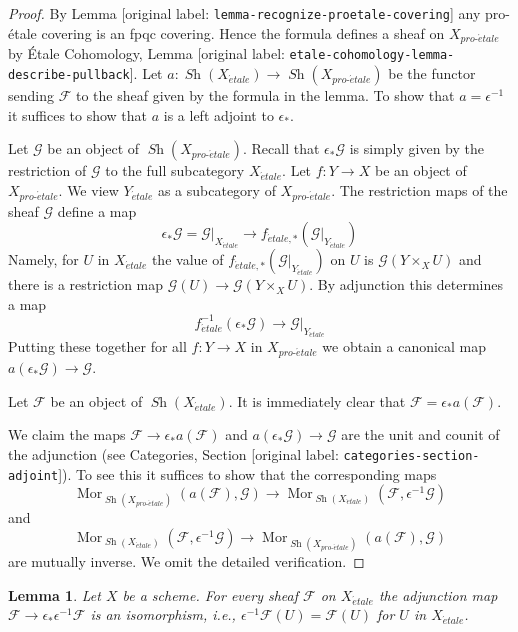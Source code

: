 \documentclass[10pt,a4paper]{article}
\theoremstyle{plain}
\newtheorem{lemma}[subsection]{Lemma}
\theoremstyle{definition}
\theoremstyle{remark}
\numberwithin{equation}{subsection}
\def\Mor{\mathop{\mathrm{Mor}}\nolimits}
\def\Sh{\mathop{\mathit{Sh}}\nolimits}
\def\proetale{{pro\text{-}\acute{e}tale}}
\def\etale{{\acute{e}tale}}
\begin{document}
\begin{proof}
By Lemma [original label: \nolinkurl{lemma-recognize-proetale-covering}] any pro-\'etale covering
is an fpqc covering. Hence the formula defines a sheaf on $X_\proetale$
by \'Etale Cohomology, Lemma [original label: \nolinkurl{etale-cohomology-lemma-describe-pullback}].
Let $a : \Sh(X_\etale) \to \Sh(X_\proetale)$ be the functor
sending $\mathcal{F}$ to the sheaf given by the formula in the lemma.
To show that $a = \epsilon^{-1}$ it suffices to show that $a$ is a
left adjoint to $\epsilon_*$.

\medskip\noindent
Let $\mathcal{G}$ be an object of $\Sh(X_\proetale)$.
Recall that $\epsilon_*\mathcal{G}$ is simply given by the restriction of
$\mathcal{G}$ to the full subcategory $X_\etale$.
Let $f : Y \to X$ be an object of $X_\proetale$.
We view $Y_\etale$ as a subcategory of $X_\proetale$.
The restriction maps of the sheaf $\mathcal{G}$ define a map
$$
\epsilon_*\mathcal{G} = \mathcal{G}|_{X_\etale}
\longrightarrow
f_{\etale, *}(\mathcal{G}|_{Y_\etale})
$$
Namely, for $U$ in $X_\etale$ the value of
$f_{\etale, *}(\mathcal{G}|_{Y_\etale})$ on $U$
is $\mathcal{G}(Y \times_X U)$ and there is a restriction
map $\mathcal{G}(U) \to \mathcal{G}(Y \times_X U)$.
By adjunction this determines a map
$$
f_\etale^{-1}(\epsilon_*\mathcal{G}) \to \mathcal{G}|_{Y_\etale}
$$
Putting these together for all $f : Y \to X$ in $X_\proetale$
we obtain a canonical map $a(\epsilon_*\mathcal{G}) \to \mathcal{G}$.

\medskip\noindent
Let $\mathcal{F}$ be an object of $\Sh(X_\etale)$. It is immediately
clear that $\mathcal{F} = \epsilon_*a(\mathcal{F})$.

\medskip\noindent 
We claim the maps $\mathcal{F} \to \epsilon_*a(\mathcal{F})$ and
$a(\epsilon_*\mathcal{G}) \to \mathcal{G}$
are the unit and counit of the adjunction (see
Categories, Section [original label: \nolinkurl{categories-section-adjoint}]).
To see this it suffices to show that the corresponding maps
$$
\Mor_{\Sh(X_\proetale)}(a(\mathcal{F}), \mathcal{G}) \to
\Mor_{\Sh(X_\etale)}(\mathcal{F}, \epsilon^{-1}\mathcal{G})
$$
and
$$
\Mor_{\Sh(X_\etale)}(\mathcal{F}, \epsilon^{-1}\mathcal{G}) \to
\Mor_{\Sh(X_\proetale)}(a(\mathcal{F}), \mathcal{G})
$$
are mutually inverse. We omit the detailed verification.
\end{proof}

\begin{lemma}
\label{lemma-fully-faithful}
Let $X$ be a scheme. For every sheaf $\mathcal{F}$ on $X_\etale$
the adjunction map $\mathcal{F} \to \epsilon_*\epsilon^{-1}\mathcal{F}$ is an
isomorphism, i.e., $\epsilon^{-1}\mathcal{F}(U) = \mathcal{F}(U)$
for $U$ in $X_\etale$.
\end{lemma}
\end{document}
